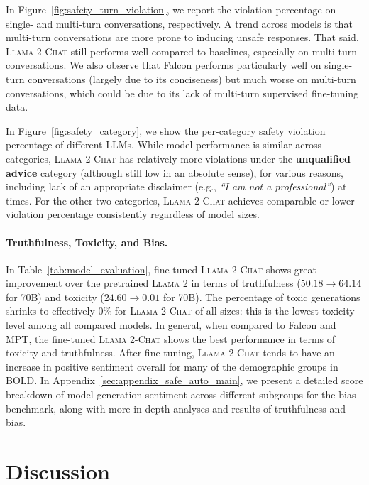 In Figure~\ref{fig:safety_turn_violation}, we report the violation percentage on single- and multi-turn conversations, respectively. A trend across models is that multi-turn conversations are more prone to inducing unsafe responses. That said, \textsc{Llama 2-Chat} still performs well compared to baselines, especially on multi-turn conversations. We also observe that Falcon performs particularly well on single-turn conversations (largely due to its conciseness) but much worse on multi-turn conversations, which could be due to its lack of multi-turn supervised fine-tuning data.

In Figure~\ref{fig:safety_category}, we show the per-category safety violation percentage of different LLMs. While model performance is similar across categories, \textsc{Llama 2-Chat} has relatively more violations under the \textbf{unqualified advice} category (although still low in an absolute sense), for various reasons, including lack of an appropriate disclaimer (e.g., \textit{``I am not a professional''}) at times. For the other two categories, \textsc{Llama 2-Chat} achieves comparable or lower violation percentage consistently regardless of model sizes.

\paragraph{Truthfulness, Toxicity, and Bias.} In Table~\ref{tab:model_evaluation}, fine-tuned \textsc{Llama 2-Chat} shows great improvement over the pretrained \textsc{Llama 2} in terms of truthfulness ($50.18 \rightarrow 64.14$ for 70B) and toxicity ($24.60 \rightarrow 0.01$ for 70B).  The percentage of toxic generations shrinks to effectively 0\% for \textsc{Llama 2-Chat} of all sizes: this is the lowest toxicity level among all compared models. In general, when compared to Falcon and MPT, the fine-tuned \textsc{Llama 2-Chat} shows the best performance in terms of toxicity and truthfulness. After fine-tuning, \textsc{Llama 2-Chat} tends to have an increase in positive sentiment overall for many of the demographic groups in BOLD. In Appendix~\ref{sec:appendix_safe_auto_main}, we present a detailed score breakdown of model generation sentiment across different subgroups for the bias benchmark, along with more in-depth analyses and results of truthfulness and bias.

\section{Discussion}
\label{sec:results_and_discussion}

